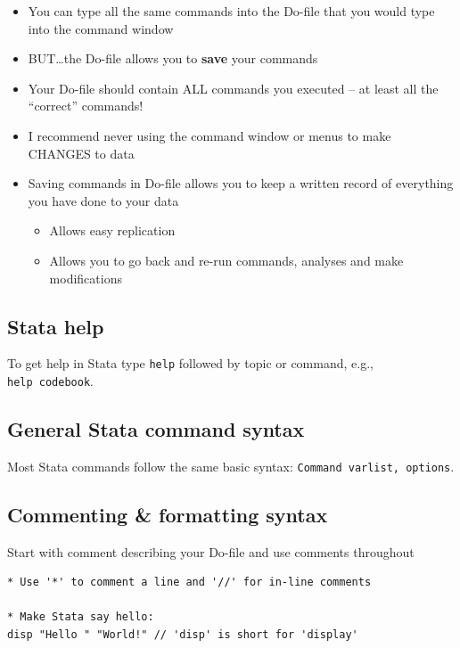 \documentclass[]{book}
\providecommand{\tightlist}{%
  \setlength{\itemsep}{0pt}\setlength{\parskip}{0pt}}
\begin{document}
\begin{itemize}
\tightlist
\item
  You can type all the same commands into the Do-file that you would
  type into the command window
\item
  BUT\ldots{}the Do-file allows you to \textbf{save} your commands
\item
  Your Do-file should contain ALL commands you executed -- at least all
  the ``correct'' commands!
\item
  I recommend never using the command window or menus to make CHANGES to
  data
\item
  Saving commands in Do-file allows you to keep a written record of
  everything you have done to your data

  \begin{itemize}
  \tightlist
  \item
    Allows easy replication
  \item
    Allows you to go back and re-run commands, analyses and make
    modifications
  \end{itemize}
\end{itemize}

\subsection{Stata help}\label{stata-help}

To get help in Stata type \texttt{help} followed by topic or command,
e.g., \texttt{help\ codebook}.

\subsection{General Stata command
syntax}\label{general-stata-command-syntax}

Most Stata commands follow the same basic syntax:
\texttt{Command\ varlist,\ options}.

\subsection{Commenting \& formatting
syntax}\label{commenting-formatting-syntax}

Start with comment describing your Do-file and use comments throughout

\begin{verbatim}
* Use '*' to comment a line and '//' for in-line comments

* Make Stata say hello:
disp "Hello " "World!" // 'disp' is short for 'display'
\end{verbatim}
\end{document}
